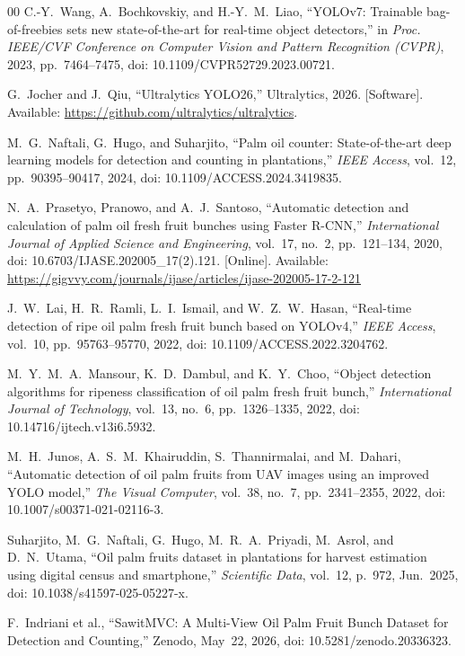 \documentclass[conference,a4paper]{IEEEtran}
\begin{document}
\begin{thebibliography}{00}
C.-Y.~Wang, A.~Bochkovskiy, and H.-Y.~M.~Liao,
``YOLOv7: Trainable bag-of-freebies sets new state-of-the-art for real-time
object detectors,''
in \textit{Proc. IEEE/CVF Conference on Computer Vision and Pattern
Recognition (CVPR)}, 2023, pp.~7464--7475,
doi: 10.1109/CVPR52729.2023.00721.

G.~Jocher and J.~Qiu,
``Ultralytics YOLO26,'' Ultralytics, 2026. [Software].
Available: \url{https://github.com/ultralytics/ultralytics}.

M.~G.~Naftali, G.~Hugo, and Suharjito,
``Palm oil counter: State-of-the-art deep learning models for detection and
counting in plantations,''
\textit{IEEE Access}, vol.~12, pp.~90395--90417, 2024,
doi: 10.1109/ACCESS.2024.3419835.

N.~A.~Prasetyo, Pranowo, and A.~J.~Santoso,
``Automatic detection and calculation of palm oil fresh fruit bunches using
Faster R-CNN,''
\textit{International Journal of Applied Science and Engineering}, vol.~17,
no.~2, pp.~121--134, 2020, doi: 10.6703/IJASE.202005\_17(2).121. [Online]. Available:
\url{https://gigvvy.com/journals/ijase/articles/ijase-202005-17-2-121}

J.~W.~Lai, H.~R.~Ramli, L.~I.~Ismail, and W.~Z.~W.~Hasan,
``Real-time detection of ripe oil palm fresh fruit bunch based on YOLOv4,''
\textit{IEEE Access}, vol.~10, pp.~95763--95770, 2022,
doi: 10.1109/ACCESS.2022.3204762.

M.~Y.~M.~A.~Mansour, K.~D.~Dambul, and K.~Y.~Choo,
``Object detection algorithms for ripeness classification of oil palm fresh
fruit bunch,''
\textit{International Journal of Technology}, vol.~13, no.~6,
pp.~1326--1335, 2022, doi: 10.14716/ijtech.v13i6.5932.

M.~H.~Junos, A.~S.~M.~Khairuddin, S.~Thannirmalai, and M.~Dahari,
``Automatic detection of oil palm fruits from UAV images using an improved
YOLO model,''
\textit{The Visual Computer}, vol.~38, no.~7, pp.~2341--2355, 2022,
doi: 10.1007/s00371-021-02116-3.

Suharjito, M.~G.~Naftali, G.~Hugo, M.~R.~A.~Priyadi, M.~Asrol, and
D.~N.~Utama,
``Oil palm fruits dataset in plantations for harvest estimation using digital
census and smartphone,''
\textit{Scientific Data}, vol.~12, p.~972, Jun.~2025,
doi: 10.1038/s41597-025-05227-x.

F.~Indriani et al.,
``SawitMVC: A Multi-View Oil Palm Fruit Bunch Dataset for Detection and
Counting,'' Zenodo, May~22, 2026,
doi: 10.5281/zenodo.20336323.


\end{thebibliography}
\end{document}
